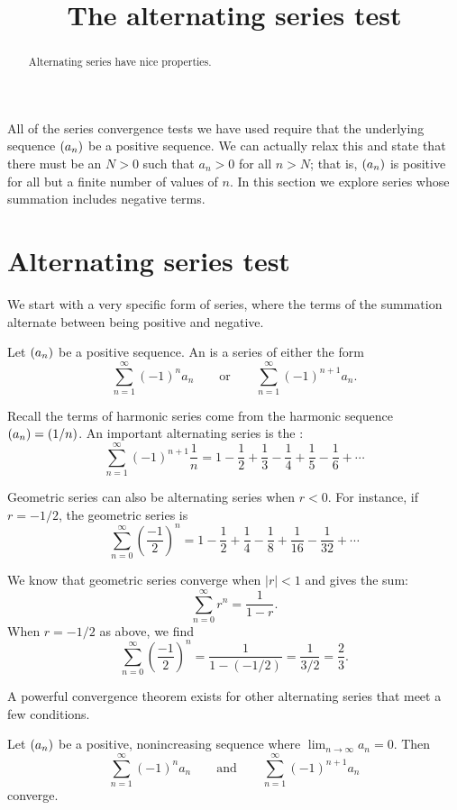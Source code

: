 \documentclass{ximera}
\title[Dig-In:]{The alternating series test}
\begin{document}
\begin{abstract}
  Alternating series have nice properties.
\end{abstract}
\maketitle

All of the series convergence tests we have used require that the
underlying sequence $\left( a_n \right)$ be a positive sequence. We can
actually relax this and state that there must be an $N>0$ such that
$a_n>0$ for all $n>N$; that is, $\left( a_n \right)$ is positive for all but a
finite number of values of $n$. In this section we explore series
whose summation includes negative terms.


\section{Alternating series test}

We start with a very specific form of series, where the terms of the
summation alternate between being positive and negative.

\begin{definition}
Let $\left( a_n \right)$ be a positive sequence. An  is
a series of either the form 
\[
\sum_{n=1}^\infty (-1)^na_n\qquad \text{or}\qquad \sum_{n=1}^\infty (-1)^{n+1}a_n.
\]
\end{definition}

Recall the terms of harmonic series come from the harmonic sequence
$\left( a_n \right) = \left( 1/n \right)$. An important alternating series is the
:
\[
\sum_{n=1}^\infty (-1)^{n+1}\frac1n = 1-\frac12+\frac13-\frac14+\frac15-\frac16+\cdots
\]

Geometric series can also be alternating series when $r<0$. For
instance, if $r=-1/2$, the geometric series is
\[
\sum_{n=0}^\infty \left(\frac{-1}{2}\right)^n = 1-\frac12+\frac14-\frac18+\frac1{16}-\frac1{32}+\cdots
\]

We know that geometric series converge when $|r|<1$ and gives the sum:
\[
\sum_{n=0}^\infty r^n = \frac1{1-r}.
\]
When $r=-1/2$ as above, we find
\[
\sum_{n=0}^\infty \left(\frac{-1}{2}\right)^n = \frac1{1-(-1/2)} = \frac 1{3/2} = \frac23.
\]

A powerful convergence theorem exists for other alternating series
that meet a few conditions.

\begin{theorem}
Let $\left( a_n \right)$ be a positive, nonincreasing sequence where
$\lim_{n\to\infty}a_n=0$. Then
\[
\sum_{n=1}^\infty (-1)^{n}a_n \qquad \text{and}\qquad \sum_{n=1}^\infty (-1)^{n+1}a_n 
\]
converge.
\end{theorem}
\end{document}

